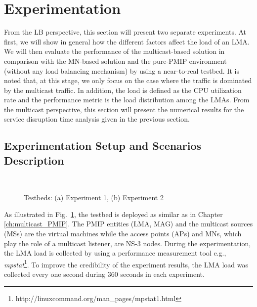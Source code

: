 \section{Experimentation}\label{c7:experiment}
From the LB perspective, this section will present two separate experiments. At first, we will show in general how the different factors affect the load of an LMA. We will then evaluate the performance of the multicast-based solution in comparison with the MN-based solution and the pure-PMIP environment (without any load balancing mechanism) by using a near-to-real testbed. It is noted that, at this stage, we only focus on the case where the traffic is dominated by the multicast traffic. In addition, the load is defined as the CPU utilization rate and the performance metric is the load distribution among the LMAs. From the multicast perspective, this section will present the numerical results for the service disruption time analysis given in the previous section. 

\subsection{Experimentation Setup and Scenarios Description}
\begin{figure}
\centering
{}\,
\caption[Testbeds for load balancing mechanisms. ]{Testbeds: (a) Experiment 1, (b) Experiment 2}
\label{fig:testbed}
\end{figure}

As illustrated in Fig.~\ref{fig:testbed}, the testbed is deployed as similar as in Chapter \ref{ch:multicast_PMIP}. The PMIP entities (LMA, MAG) and the multicast sources (MSs) are the virtual machines while the access points (APs) and MNs, which play the role of a multicast listener, are NS-3 nodes. During the experimentation, the LMA load is collected by using a performance measurement tool e.g., \textit{mpstat}\footnote{http://linuxcommand.org/man\_pages/mpstat1.html}. To improve the credibility of the experiment results, the LMA load was collected every one second during 360 seconds in each experiment. 

